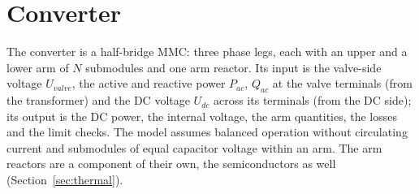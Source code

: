 \section{Converter}
\label{sec:converter}

The converter is a half-bridge MMC: three phase legs, each with an upper and a lower arm of $N$ submodules and one
arm reactor. Its input is the valve-side voltage $U_{valve}$, the active and reactive power $P_{ac}$, $Q_{ac}$ at the
valve terminals (from the transformer) and the DC voltage $U_{dc}$ across its terminals (from the DC side); its
output is the DC power, the internal voltage, the arm quantities, the losses and the limit checks. The model assumes
balanced operation without circulating current and submodules of equal capacitor voltage within an arm. The arm
reactors are a component of their own, the semiconductors as well (Section~\ref{sec:thermal}).





